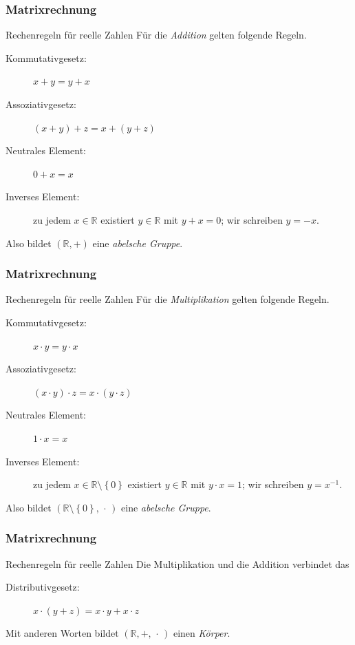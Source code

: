 \documentclass{beamer}
\renewcommand{\emph}[1]{{\textcolor{solarizedRed}{\itshape #1}}}
\newcommand\RR{\mathbb R}
\newcommand\cbc[1]{\left\{{#1}\right\}}
\renewcommand{\oe}{\"o}
\newcommand{\ue}{\"u}
\newcommand{\mytitle}{Matrixrechnung}
\begin{document}
\begin{frame}\frametitle{\mytitle}
	\begin{block}{Rechenregeln f\ue r reelle Zahlen}
		F\ue r die \emph{Addition} gelten folgende Regeln.
		\begin{description}
			\item[Kommutativgesetz:] $x+y=y+x$
			\item[Assoziativgesetz:] $(x+y)+z=x+(y+z)$
			\item[Neutrales Element:] $0+x=x$
			\item[Inverses Element:] zu jedem $x\in\RR$ existiert $y\in\RR$ mit $y+x=0$; wir schreiben $y=-x$.
		\end{description}
		Also bildet $(\RR,+)$ eine \emph{abelsche Gruppe}.
	\end{block}
\end{frame}

\begin{frame}\frametitle{\mytitle}
	\begin{block}{Rechenregeln f\ue r reelle Zahlen}
		F\ue r die \emph{Multiplikation} gelten folgende Regeln.
		\begin{description}
			\item[Kommutativgesetz:] $x\cdot y=y\cdot x$
			\item[Assoziativgesetz:] $(x\cdot y)\cdot z=x\cdot (y\cdot z)$
			\item[Neutrales Element:] $1\cdot x=x$
			\item[Inverses Element:] zu jedem $x\in\RR\setminus\cbc 0$ existiert $y\in\RR$ mit $y\cdot x=1$; wir schreiben $y=x^{-1}$.
		\end{description}
		Also bildet $(\RR\setminus\cbc 0,\,\cdot\,)$ eine \emph{abelsche Gruppe}.
	\end{block}
\end{frame}

\begin{frame}\frametitle{\mytitle}
	\begin{block}{Rechenregeln f\ue r reelle Zahlen}
		Die Multiplikation und die Addition verbindet das
		\begin{description}
			\item[Distributivgesetz:] $x\cdot(y+z)=x\cdot y+x\cdot z$
		\end{description}
	Mit anderen Worten bildet $(\RR,+,\,\cdot\,)$ einen \emph{K\oe rper}.
	\end{block}
\end{frame}
\end{document}
